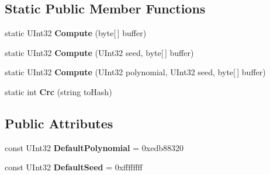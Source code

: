 \subsection*{Static Public Member Functions}
\begin{DoxyCompactItemize}
\item 
\hypertarget{class_cloud_api_public_1_1_s_q_l_indexer_1_1_string_c_r_c_a291e16448a61c1e79cf51fcc66aafee7}{static U\-Int32 {\bfseries Compute} (byte\mbox{[}$\,$\mbox{]} buffer)}\label{class_cloud_api_public_1_1_s_q_l_indexer_1_1_string_c_r_c_a291e16448a61c1e79cf51fcc66aafee7}

\item 
\hypertarget{class_cloud_api_public_1_1_s_q_l_indexer_1_1_string_c_r_c_aa35a02ef98797c1faed4245ecbf2412b}{static U\-Int32 {\bfseries Compute} (U\-Int32 seed, byte\mbox{[}$\,$\mbox{]} buffer)}\label{class_cloud_api_public_1_1_s_q_l_indexer_1_1_string_c_r_c_aa35a02ef98797c1faed4245ecbf2412b}

\item 
\hypertarget{class_cloud_api_public_1_1_s_q_l_indexer_1_1_string_c_r_c_a890053ef21ccb0a95ef4ef4fc4c7bfce}{static U\-Int32 {\bfseries Compute} (U\-Int32 polynomial, U\-Int32 seed, byte\mbox{[}$\,$\mbox{]} buffer)}\label{class_cloud_api_public_1_1_s_q_l_indexer_1_1_string_c_r_c_a890053ef21ccb0a95ef4ef4fc4c7bfce}

\item 
\hypertarget{class_cloud_api_public_1_1_s_q_l_indexer_1_1_string_c_r_c_aabed244c8065c0fd12ac14f68cb979a1}{static int {\bfseries Crc} (string to\-Hash)}\label{class_cloud_api_public_1_1_s_q_l_indexer_1_1_string_c_r_c_aabed244c8065c0fd12ac14f68cb979a1}

\end{DoxyCompactItemize}
\subsection*{Public Attributes}
\begin{DoxyCompactItemize}
\item 
\hypertarget{class_cloud_api_public_1_1_s_q_l_indexer_1_1_string_c_r_c_adce937ed1718a406b2a3e0922bb2ffd2}{const U\-Int32 {\bfseries Default\-Polynomial} = 0xedb88320}\label{class_cloud_api_public_1_1_s_q_l_indexer_1_1_string_c_r_c_adce937ed1718a406b2a3e0922bb2ffd2}

\item 
\hypertarget{class_cloud_api_public_1_1_s_q_l_indexer_1_1_string_c_r_c_aff9bbf50f8c4624eaf65f447b433be12}{const U\-Int32 {\bfseries Default\-Seed} = 0xffffffff}\label{class_cloud_api_public_1_1_s_q_l_indexer_1_1_string_c_r_c_aff9bbf50f8c4624eaf65f447b433be12}

\end{DoxyCompactItemize}
